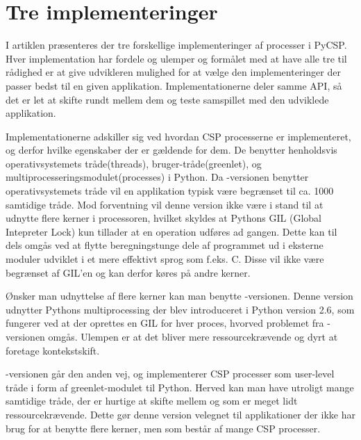 \section{Tre implementeringer}
I artiklen \cite{Friborg2009} præsenteres der tre forskellige implementeringer af processer i PyCSP. Hver implementation har fordele og ulemper og formålet med at have alle tre til rådighed er at give udvikleren mulighed for at vælge den implementeringer der passer bedst til en given applikation. Implementationerne deler samme API, så det er let at skifte rundt mellem dem og teste samspillet med den udviklede applikation. 

Implementationerne adskiller sig ved hvordan CSP processerne er implementeret, og derfor hvilke egenskaber der er gældende for dem. De benytter henholdsvis operativsystemets tråde(threads), bruger-tråde(greenlet), og multiprocesseringsmodulet(processes) i Python. Da -versionen benytter operativsystemets tråde vil en applikation typisk være begrænset til ca. 1000 samtidige tråde\cite[3]{Friborg2009}. Mod forventning vil denne version ikke være i stand til at udnytte flere kerner i processoren, hvilket skyldes at Pythons GIL (Global Intepreter Lock) kun tillader at en operation udføres ad gangen. Dette kan til dels omgås ved at flytte beregningstunge dele af programmet ud i eksterne moduler udviklet i et mere effektivt sprog som f.eks. C. Disse vil ikke være begrænset af GIL'en og kan derfor køres på andre kerner. 

Ønsker man udnyttelse af flere kerner kan man benytte -versionen. Denne version udnytter Pythons multiprocessing der blev introduceret i Python version 2.6, som fungerer ved at der oprettes en GIL for hver proces, hvorved problemet fra -versionen omgås. Ulempen er at det bliver mere ressourcekrævende og dyrt at foretage kontekstskift. 

-versionen går den anden vej, og implementerer CSP processer som user-level tråde i form af greenlet-modulet til Python\cite{greenlet}. Herved kan man have utroligt mange samtidige tråde, der er hurtige at skifte mellem og som er meget lidt ressourcekrævende. Dette gør denne version velegnet til applikationer der ikke har brug for at benytte flere kerner, men som består af mange CSP processer. 

